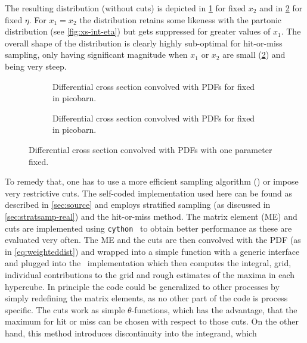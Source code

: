 The resulting distribution (without cuts) is depicted in
\cref{fig:dist-pdf} for fixed \(x_2\) and in
\cref{fig:dist-pdf-fixed-eta} for fixed \(\eta\). For \(x_1 = x_2\)
the distribution retains some likeness with the partonic distribution
(see \cref{fig:xs-int-eta}) but gets suppressed for greater values of
\(x_1\). The overall shape of the distribution is clearly highly
sub-optimal for hit-or-miss sampling, only having significant magnitude
when \(x_1\) or \(x_2\) are small (\cref{fig:dist-pdf-fixed-eta}) and
being very steep.
%
\begin{figure}[ht]
  \centering
  \begin{subfigure}{1\textwidth}
    \centering {}
    \caption{\label{fig:dist-pdf}Differential cross section convolved
      with PDFs for fixed \protect {} in
      picobarn.}
  \end{subfigure}
%
  \begin{subfigure}{1\textwidth}
    \centering {}
    \caption{\label{fig:dist-pdf-fixed-eta}Differential cross section
      convolved with PDFs for fixed \protect
       in picobarn.}
  \end{subfigure}
  \caption{\label{fig:dist-pdf-3d}Differential cross section
    convolved with PDFs with one parameter fixed.}
\end{figure}
%
To remedy that, one has to use a more efficient sampling algorithm
(\vegas) or impose very restrictive cuts. The self-coded
implementation used here can be found as described in
\cref{sec:source} and employs stratified sampling (as discussed in
\cref{sec:stratsamp-real}) and the hit-or-miss method. The matrix
element (ME) and cuts are implemented using
\texttt{cython}~\cite{behnel2011:cy} to obtain better performance as
these are evaluated very often. The ME and the cuts are then convolved
with the PDF (as in \cref{eq:weighteddist}) and wrapped into a simple
function with a generic interface and plugged into the \vegas\
implementation which then computes the integral, grid, individual
contributions to the grid and rough estimates of the maxima in each
hypercube. In principle the code could be generalized to other
processes by simply redefining the matrix elements, as no other part
of the code is process specific. The cuts work as simple
\(\theta\)-functions, which has the advantage, that the maximum for
hit or miss can be chosen with respect to those cuts. On the other
hand, this method introduces discontinuity into the integrand, which
